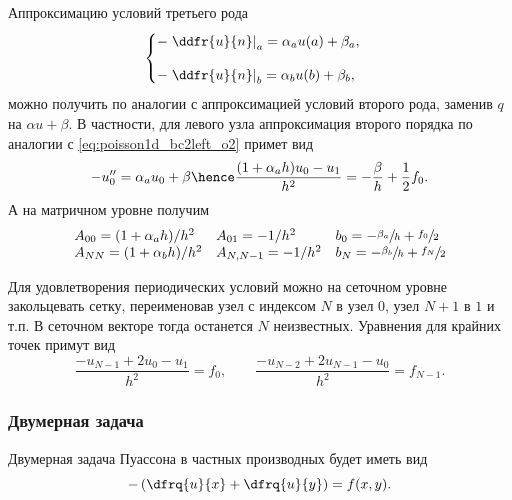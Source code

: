 Аппроксимацию условий третьего рода
\begin{equation}
	\label{eq:poisson1d_bc2}
	\begin{cases}
        -\left.\ddfr{u}{n}\right|_a=\alpha_a u(a) + \beta_a,\\[10pt]
        -\left.\ddfr{u}{n}\right|_b=\alpha_b u(b) + \beta_b,
	\end{cases}
\end{equation}
можно получить по аналогии с аппроксимацией
условий второго рода, заменив $q$ на $\alpha u + \beta$.
В частности, для левого узла
аппроксимация второго порядка по аналогии с \cref{eq:poisson1d_bc2left_o2}
примет вид
\begin{equation*}
\label{eq:poisson1d_bc3left_o2}
-u''_0 = \alpha_a u_0 + \beta \hence
\frac{(1 + \alpha_a h) u_{0} - u_{1}}{h^2} = -\frac{\beta}{h} + \frac{1}{2} f_0.
\end{equation*}
А на матричном уровне получим
\begin{equation}
\label{eq:poisson1d_bc3_o2}
\begin{array}{lll}
A_{00} = (1 + \alpha_a h)/h^2 & A_{01} = -1/h^2 & b_0 = -\sfrac{\beta_a}{h} + \sfrac{f_0}{2} \\
A_{NN} = (1 + \alpha_b h)/h^2 & A_{N,N-1} = -1/h^2 & b_N = -\sfrac{\beta_b}{h} + \sfrac{f_N}{2}
\end{array}
\end{equation}


Для удовлетворения периодических условий
можно на сеточном уровне 
закольцевать сетку, переименовав
узел с индексом ${N}$ в узел $0$, узел ${N+1}$ в $1$  и т.п.
В сеточном векторе тогда останется $N$ неизвестных.
Уравнения для крайних точек примут вид
\begin{equation}
    \label{eq:poisson1d_per0}
    \frac{-u_{N-1} + 2u_{0} - u_{1}}{h^2} = f_0, \qquad 
    \frac{-u_{N-2} + 2u_{N-1} - u_{0}}{h^2} = f_{N-1}.
\end{equation}

\subsubsection{Двумерная задача}
Двумерная задача Пуассона в частных производных будет иметь вид
\begin{equation}
    \label{eq:poisson_2d}
   -\left(\dfrq{u}{x} + \dfrq{u}{y}\right) = f(x, y).
\end{equation}

